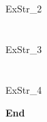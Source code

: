 \documentclass[a4paper, leqno, 12pt]{article} %
\newenvironment{top_enumerate}{
\begin{enumerate}
  \setlength{\itemsep}{2em}
  \setlength{\topsep}{-0pt}
  \setlength{\partopsep}{-0pt}
}{\end{enumerate}}
\begin{document}
\bigskip
\section*{}

\begin{top_enumerate}

ExStr_2

\end{top_enumerate}

\bigskip
\section*{}

\begin{top_enumerate}

ExStr_3

\end{top_enumerate}

\bigskip
\section*{}

\begin{top_enumerate}

ExStr_4

\end{top_enumerate}

%
%
%

\rfoot{}                %
\begin{flushright}      %
\textbf{End}
\end{flushright}
\end{document}
